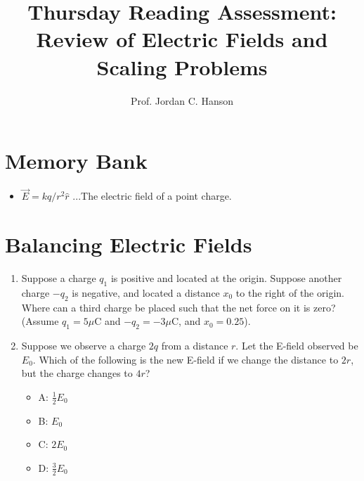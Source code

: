 \documentclass{article}
\begin{document}
\title{Thursday Reading Assessment: Review of Electric Fields and Scaling Problems}
\author{Prof. Jordan C. Hanson}

\maketitle

\section{Memory Bank}

\begin{itemize}
\item $\vec{E} = kq/r^2 \hat{r}$ ...The electric field of a point charge. 
\end{itemize}

\section{Balancing Electric Fields}

\begin{enumerate}
\item Suppose a charge $q_1$ is positive and located at the origin.  Suppose another charge $-q_2$ is negative, and located a distance $x_0$ to the right of the origin.  Where can a third charge be placed such that the net force on it is zero? (Assume $q_1 = 5\mu$C and $-q_2 = -3\mu$C, and $x_0 = 0.25$).\\ \vspace{4cm}
\item Suppose we observe a charge $2q$ from a distance $r$.  Let the E-field observed be $E_0$.  Which of the following is the new E-field if we change the distance to $2 r$, but the charge changes to $4 r$?
\begin{itemize}
\item A: $\frac{1}{2} E_0$
\item B: $ E_0$
\item C: $2 E_0$
\item D: $\frac{3}{2} E_0$
\end{itemize}
\end{enumerate}
\end{document}
